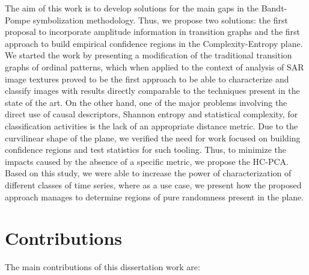 The aim of this work is to develop solutions for the main gaps in the Bandt-Pompe symbolization methodology.
Thus, we propose two solutions: the first proposal to incorporate amplitude information in transition graphs and the first approach to build empirical confidence regions in the Complexity-Entropy plane.
We started the work by presenting a modification of the traditional transition graphs of ordinal patterns, which when applied to the context of analysis of SAR image textures proved to be the first approach to be able to characterize and classify images with results directly comparable to the techniques present in the state of the art.
On the other hand, one of the major problems involving the direct use of causal descriptors, Shannon entropy and statistical complexity, for classification activities is the lack of an appropriate distance metric.
Due to the curvilinear shape of the plane, we verified the need for work focused on building confidence regions and test statistics for such tooling.
Thus, to minimize the impacts caused by the absence of a specific metric, we propose the HC-PCA.
Based on this study, we were able to increase the power of characterization of different classes of time series, where as a use case, we present how the proposed approach manages to determine regions of pure randomness present in the plane.

\section{Contributions}

The main contributions of this dissertation work are:
    
